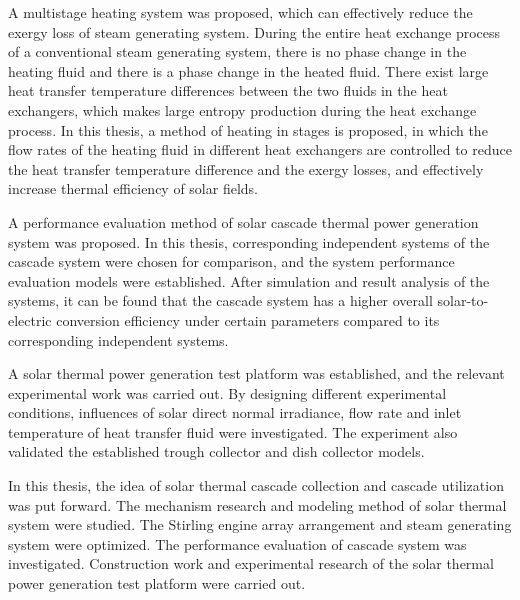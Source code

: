 {A multistage heating system was proposed, which can effectively reduce the exergy loss of steam generating system. During the entire heat exchange process of a conventional steam generating system, there is no phase change in the heating fluid and there is a phase change in the heated fluid. There exist large heat transfer temperature differences between the two fluids in the heat exchangers, which makes large entropy production during the heat exchange process. In this thesis, a method of heating in stages is proposed, in which the flow rates of the heating fluid in different heat exchangers are controlled to reduce the heat transfer temperature difference and the exergy losses, and effectively increase thermal efficiency of solar fields.

A performance evaluation method of solar cascade thermal power generation system was proposed. In this thesis, corresponding independent systems of the cascade system were chosen for comparison, and the system performance evaluation models were established. After simulation and result analysis of the systems, it can be found that the cascade system has a higher overall solar-to-electric conversion efficiency under certain parameters compared to its corresponding independent systems.

A solar thermal power generation test platform was established, and the relevant experimental work was carried out. By designing different experimental conditions, influences of solar direct normal irradiance, flow rate and inlet temperature of heat transfer fluid were investigated.
The experiment also validated the established trough collector and dish collector models.

In this thesis, the idea of solar thermal cascade collection and cascade utilization was put forward. The mechanism research and modeling method of solar thermal system were studied. The Stirling engine array arrangement and steam generating system were optimized. The performance evaluation of cascade system was investigated. Construction work and experimental research of the solar thermal power generation test platform were carried out.

}
